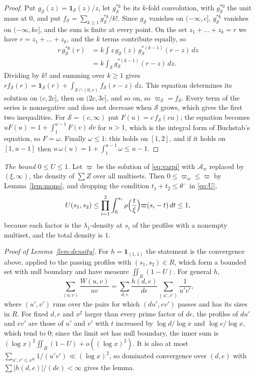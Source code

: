 \documentclass[aps,prd,twocolumn,superscriptaddress,nofootinbib,longbibliography,floatfix,showkeys,nobalancelastpage,amsmath,amssymb,10pt]{revtex4-2}
\theoremstyle{plain}
\theoremstyle{definition}
\theoremstyle{plain}
\newcommand{\one}{\mathbf{1}}
\begin{document}
\begin{proof}
Put $g_{\mathcal S}(z)=\one_{\mathcal S}(z)/z$, let $g^{*k}_{\mathcal S}$ be its $k$-fold convolution, with $g^{*0}_{\mathcal S}$ the unit mass at $0$, and put $f_{\mathcal S}=\sum_{k\ge1}g_{\mathcal S}^{*k}/k!$. Since $g_{\mathcal S}$ vanishes on $(-\infty,c]$, $g_{\mathcal S}^{*k}$ vanishes on $(-\infty,kc]$, and the sum is finite at every point. On the set $z_1+\dots+z_k=r$ we have $r=z_1+\dots+z_k$, and the $k$ terms contribute equally, so
\begin{align*}
r\,g_{\mathcal S}^{*k}(r)&=k\int z\,g_{\mathcal S}(z)\,g_{\mathcal S}^{*(k-1)}(r-z)\,dz\\
&=k\int_{\mathcal S}g_{\mathcal S}^{*(k-1)}(r-z)\,dz.
\end{align*}
Dividing by $k!$ and summing over $k\ge1$ gives $rf_{\mathcal S}(r)=\one_{\mathcal S}(r)+\int_{\mathcal S\cap(0,r)}f_{\mathcal S}(r-z)\,dz$. This equation determines its solution on $(c,2c]$, then on $(2c,3c]$, and so on, so $\varpi_{\mathcal S}=f_{\mathcal S}$. Every term of the series is nonnegative and does not decrease when $\mathcal S$ grows, which gives the first two inequalities. For $\mathcal S=(c,\infty)$ put $F(u)=c\,f_{\mathcal S}(cu)$; the equation becomes $uF(u)=1+\int_1^{u-1}F(v)\,dv$ for $u>1$, which is the integral form of Buchstab's equation, so $F=\omega$. Finally $\omega\le1$: this holds on $[1,2]$, and if it holds on $[1,u-1]$ then $u\,\omega(u)=1+\int_1^{u-1}\omega\le u-1$.
\end{proof}

\emph{The bound $0\le U\le1$.} Let $\varpi$ be the solution of \eqref{eq:varpi} with $\mathcal A_w$ replaced by $(\xi,\infty)$, the density of $\sum Z$ over all multisets. Then $0\le\varpi_w\le\varpi$ by Lemma~\ref{lem:mono}, and dropping the condition $t_1+t_2\le\theta^-$ in \eqref{eq:U},
\[
U(s_1,s_2)\le\prod_{i=1}^2\int_0^{s_i}\rho\Bigl(\frac{t}{\xi}\Bigr)\varpi(s_i-t)\,dt\le1,
\]
because each factor is the $\lambda_1$-density at $s_i$ of the profiles with a nonempty multiset, and the total density is $1$.

\emph{Proof of Lemma~\ref{lem:density}.} For $h=\one_{(1,1)}$ the statement is the convergence above, applied to the passing profiles with $(s_1,s_2)\in R$, which form a bounded set with null boundary and have measure $\iint_R(1-U)$. For general $h$,
\[
\sum_{(u,v)}\frac{W(u,v)}{uv}=\sum_{d,e}\frac{h(d,e)}{de}\sum_{(u',v')}\frac1{u'v'},
\]
where $(u',v')$ runs over the pairs for which $(du',ev')$ passes and has its sizes in $R$. For fixed $d,e$ and $x^\xi$ larger than every prime factor of $de$, the profiles of $du'$ and $ev'$ are those of $u'$ and $v'$ with $t$ increased by $\log d/\log x$ and $\log e/\log x$, which tend to $0$; since the limit set has null boundary, the inner sum is $(\log x)^2\iint_R(1-U)+o((\log x)^2)$. It is also at most $\sum_{u',v'\le x^K}1/(u'v')\ll(\log x)^2$, so dominated convergence over $(d,e)$ with $\sum|h(d,e)|/(de)<\infty$ gives the lemma.
\end{document}
